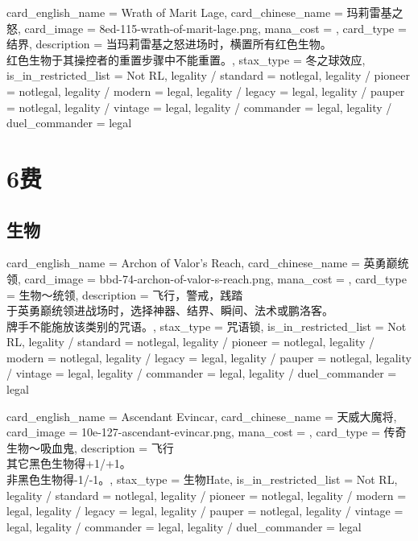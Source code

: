 \documentclass[lang = cn, color = black, 10pt]{AllThatStax}
\begin{document}
\card
{
	card_english_name = {Wrath of Marit Lage},
	card_chinese_name = {玛莉雷基之怒},
	card_image = 8ed-115-wrath-of-marit-lage.png,
	mana_cost = ,
	card_type = 结界,
	description = {当玛莉雷基之怒进场时，横置所有红色生物。\\
红色生物于其操控者的重置步骤中不能重置。},
	stax_type = 冬之球效应,
	is_in_restricted_list = Not RL,
	legality / standard = notlegal,
	legality / pioneer = notlegal,
	legality / modern = legal,
	legality / legacy = legal,
	legality / pauper = notlegal,
	legality / vintage = legal,
	legality / commander = legal,
	legality / duel_commander = legal
}

\chapter{6费}

\section{生物}

\card
{
	card_english_name = {Archon of Valor's Reach},
	card_chinese_name = {英勇巅统领},
	card_image = bbd-74-archon-of-valor-s-reach.png,
	mana_cost = ,
	card_type = 生物～统领,
	description = {飞行，警戒，践踏\\
于英勇巅统领进战场时，选择神器、结界、瞬间、法术或鹏洛客。\\
牌手不能施放该类别的咒语。},
	stax_type = 咒语锁,
	is_in_restricted_list = Not RL,
	legality / standard = notlegal,
	legality / pioneer = notlegal,
	legality / modern = notlegal,
	legality / legacy = legal,
	legality / pauper = notlegal,
	legality / vintage = legal,
	legality / commander = legal,
	legality / duel_commander = legal
}

\card
{
	card_english_name = {Ascendant Evincar},
	card_chinese_name = {天威大魔将},
	card_image = 10e-127-ascendant-evincar.png,
	mana_cost = ,
	card_type = 传奇生物～吸血鬼,
	description = {飞行\\
其它黑色生物得+1/+1。\\
非黑色生物得-1/-1。},
	stax_type = 生物Hate,
	is_in_restricted_list = Not RL,
	legality / standard = notlegal,
	legality / pioneer = notlegal,
	legality / modern = legal,
	legality / legacy = legal,
	legality / pauper = notlegal,
	legality / vintage = legal,
	legality / commander = legal,
	legality / duel_commander = legal
}
\end{document}
